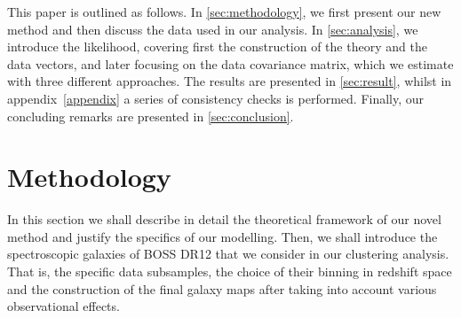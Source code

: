 \documentclass[astrosymb,twocolumn]{aastex631}
\newcommand{\stefc}[1]{\textcolor{red}{\textsf{[\textbf{Stef:} #1]}}}
\begin{document}
This paper is outlined as follows. In \autoref{sec:methodology}, we first present our new method and then discuss the data used in our analysis. In \autoref{sec:analysis}, we introduce the likelihood, covering first the construction of the theory and the data vectors, and later focusing on the data covariance matrix, which we estimate with three different approaches. The results are presented in \autoref{sec:result}, whilst in appendix~\ref{appendix} a series of consistency checks is performed. Finally, our concluding remarks are presented in \autoref{sec:conclusion}.



\section{Methodology}
\label{sec:methodology}
In this section we shall describe in detail the theoretical framework of our novel method and justify the specifics of our modelling. 
Then, we shall introduce the spectroscopic galaxies of BOSS DR12 \citep{Alam_2015} that we consider in our clustering analysis. That is, the specific data subsamples, the choice of their binning in redshift space and the construction of the final galaxy maps after taking into account various observational effects.
\end{document}
